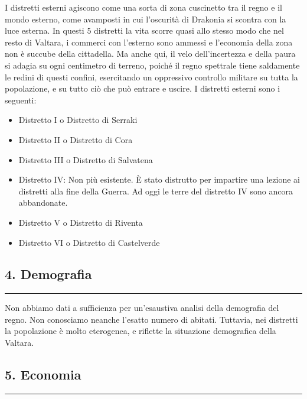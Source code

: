 I distretti esterni agiscono come una sorta di zona cuscinetto tra il
regno e il mondo esterno, come avamposti in cui l'oscurità di Drakonia
si scontra con la luce esterna. In questi 5 distretti la vita scorre
quasi allo stesso modo che nel resto di Valtara, i commerci con
l'esterno sono ammessi e l'economia della zona non è succube della
cittadella. Ma anche qui, il velo dell'incertezza e della paura si
adagia su ogni centimetro di terreno, poiché il regno spettrale tiene
saldamente le redini di questi confini, esercitando un oppressivo
controllo militare su tutta la popolazione, e su tutto ciò che può
entrare e uscire. I distretti esterni sono i seguenti:

\begin{itemize}
\tightlist
\item
  Distretto I o Distretto di Serraki
\item
  Distretto II o Distretto di Cora
\item
  Distretto III o Distretto di Salvatena
\item
  Distretto IV: Non più esistente. È stato distrutto per impartire una
  lezione ai distretti alla fine della Guerra. Ad oggi le terre del
  distretto IV sono ancora abbandonate.
\item
  Distretto V o Distretto di Riventa
\item
  Distretto VI o Distretto di Castelverde
\end{itemize}

\subsection{4. Demografia}\label{demografia}

\begin{center}\rule{0.5\linewidth}{0.5pt}\end{center}

Non abbiamo dati a sufficienza per un'esaustiva analisi della demografia
del regno. Non conosciamo neanche l'esatto numero di abitati. Tuttavia,
nei distretti la popolazione è molto eterogenea, e riflette la
situazione demografica della Valtara.

\subsection{5. Economia}\label{economia}

\begin{center}\rule{0.5\linewidth}{0.5pt}\end{center}

